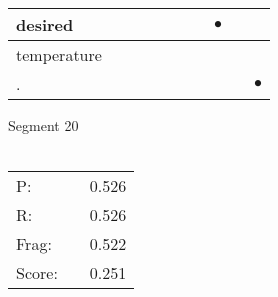 \documentclass[landscape]{article}
\newcommand{\ssp}{\hspace{2pt}}
\newcommand{\mex}{\cellcolor{g}$\bullet$}
\begin{document}
\begin{tabular}{|l|p{10pt}|p{10pt}|p{10pt}|p{10pt}|p{10pt}|p{10pt}|p{10pt}|p{10pt}|p{10pt}|}
\hline
\ssp \cellcolor{ref6}desired \ssp&\hspace{2pt}&\hspace{2pt}&\hspace{2pt}&\hspace{2pt}&\hspace{2pt}&\hspace{2pt}&\hspace{2pt}\mex&\hspace{2pt}&\hspace{2pt}\\
\hline
\ssp temperature \ssp&\hspace{2pt}&\hspace{2pt}&\hspace{2pt}&\hspace{2pt}&\hspace{2pt}&\hspace{2pt}&\hspace{2pt}&\hspace{2pt}&\hspace{2pt}\\
\hline
\ssp \cellcolor{ref8}. \ssp&\hspace{2pt}&\hspace{2pt}&\hspace{2pt}&\hspace{2pt}&\hspace{2pt}&\hspace{2pt}&\hspace{2pt}&\hspace{2pt}&\hspace{2pt}\mex\\
\hline
\end{tabular}

\vspace{6pt}
\noindent Segment 20\\\\
\noindent\begin{tabular}{lm{12pt}r}
\hline
P:&&0.526\\
R:&&0.526\\
Frag:&&0.522\\
Score:&&0.251\\
\end{tabular}

\newpage
\end{document}
